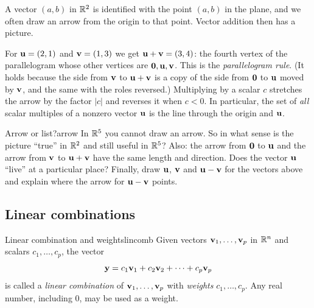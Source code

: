 \documentclass[11pt]{article}
\begin{document}
A vector $(a,b)$ in $\mathbb{R}^2$ is identified with the point $(a,b)$ in the plane, and we often draw an arrow from the origin to
that point. Vector addition then has a picture.

\begin{center}
\end{center}

For $\mathbf{u}=(2,1)$ and $\mathbf{v}=(1,3)$ we get $\mathbf{u}+\mathbf{v}=(3,4)$: the fourth vertex of the parallelogram whose other
vertices are $\mathbf{0},\mathbf{u},\mathbf{v}$. This is the \emph{parallelogram rule}. (It holds because the side from $\mathbf{v}$ to
$\mathbf{u}+\mathbf{v}$ is a copy of the side from $\mathbf{0}$ to $\mathbf{u}$ moved by $\mathbf{v}$, and the same with the roles reversed.)
Multiplying by a scalar $c$ stretches the arrow by the factor $|c|$ and reverses it when $c<0$. In particular, the set of
\emph{all} scalar multiples of a nonzero vector $\mathbf{u}$ is the line through the origin and $\mathbf{u}$.

\begin{think}{Arrow or list?}{arrow}
In $\mathbb{R}^5$ you cannot draw an arrow. So in what sense is the picture ``true'' in $\mathbb{R}^2$ and still useful in $\mathbb{R}^5$?
Also: the arrow from $\mathbf{0}$ to $\mathbf{u}$ and the arrow from $\mathbf{v}$ to $\mathbf{u}+\mathbf{v}$ have the same length and direction.
Does the vector $\mathbf{u}$ ``live'' at a particular place? Finally, draw $\mathbf{u}$, $\mathbf{v}$ and $\mathbf{u}-\mathbf{v}$ for the vectors above and
explain where the arrow for $\mathbf{u}-\mathbf{v}$ points.
\end{think}

\subsection*{Linear combinations}

\begin{defn}{Linear combination and weights}{lincomb}
Given vectors $\mathbf{v}_1,\dots,\mathbf{v}_p$ in $\mathbb{R}^n$ and scalars $c_1,\dots,c_p$, the vector
\[
\mathbf{y}=c_1\mathbf{v}_1+c_2\mathbf{v}_2+\cdots+c_p\mathbf{v}_p
\]
is called a \emph{linear combination} of $\mathbf{v}_1,\dots,\mathbf{v}_p$ with \emph{weights} $c_1,\dots,c_p$.
Any real number, including $0$, may be used as a weight.
\end{defn}
\end{document}
